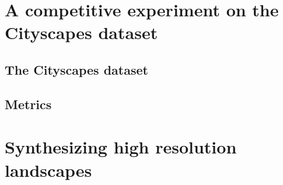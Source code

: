 
\section{A competitive experiment on the Cityscapes dataset} \label{sec:5.4}

\subsection{The Cityscapes dataset}
\subsection{Metrics}

\section{Synthesizing high resolution landscapes} \label{sec:5.5}


